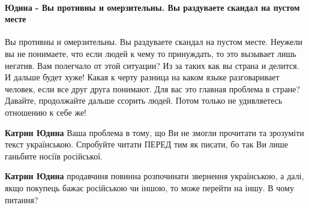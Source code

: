  
 
 
 
 
\paragraph{Юдина - Вы противны и омерзительны. Вы раздуваете скандал на пустом месте}

\begin{itemize}
 

Вы противны и омерзительны. Вы раздуваете скандал на пустом месте. Неужели вы
не понимаете, что если людей к чему то принуждать, то это вызывает лишь
негатив. Вам полегчало от этой ситуации? Из за таких как вы страна и делится. И
дальше будет хуже! Какая к черту разница на каком языке разговаривает человек,
если все друг друга понимают. Для вас это главная проблема в стране? Давайте,
продолжайте дальше ссорить людей. Потом только не удивляетесь отношению к себе
же!

\begin{itemize}
 
\textbf{Катрин Юдина} Ваша проблема в тому, що Ви не змогли прочитати та зрозуміти текст українською. Спробуйте читати ПЕРЕД тим як писати, бо так Ви лише ганьбите носіїв російської.

 
\textbf{Катрин Юдина} продавчиня повинна розпочинати звернення українською, а далі, якщо покупець бажає російською чи іншою, то може перейти на іншу. В чому питання?


\end{itemize}
\end{itemize}
